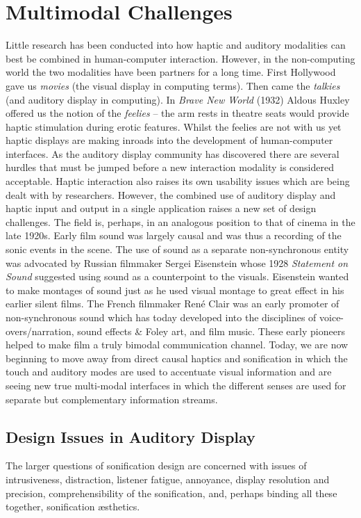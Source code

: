 \documentclass[runningheads]{llncs}
\begin{document}
\section{Multimodal Challenges}
Little research has been conducted into how haptic and auditory modalities can best be combined in human-computer interaction. However, in the non-computing world the two modalities have been partners for a long time. First Hollywood gave us \emph{movies} (the visual display in computing terms). Then came the \emph{talkies} (and auditory display in computing). In  \emph{Brave New World} (1932) Aldous Huxley offered us the notion of the \emph{feelies} -- the arm rests in theatre seats would provide haptic stimulation during erotic features. Whilst the feelies are not with us yet haptic displays are making inroads into the development of human-computer interfaces.  As the auditory display community has discovered there are several hurdles that must be jumped before a new interaction modality is considered acceptable. Haptic interaction also raises its own usability issues which are being dealt with by researchers. However, the combined use of auditory display and haptic input and output in a single application raises a new set of design challenges. The field is, perhaps, in an analogous position to that of cinema in the late 1920s. Early film sound was largely causal  and was thus a recording of the sonic events in the scene. The use of sound as a separate non-synchronous entity was advocated by Russian filmmaker Sergei Eisenstein whose 1928 \textit{Statement on Sound} \cite{Eisenstein:1988} suggested using sound as a counterpoint to the visuals. Eisenstein wanted to make montages of sound just as he used visual montage to great effect in his earlier silent films. The French filmmaker Ren\'{e} Clair was an early promoter of non-synchronous sound which has today developed into the disciplines of voice-overs/narration, sound effects \& Foley art, and film music. These early pioneers helped to make film a truly bimodal communication channel. Today, we are now beginning to move away from direct causal haptics and sonification in which the touch and auditory modes are used to accentuate visual information and are seeing new true multi-modal interfaces in which the different senses are used for separate but complementary information streams.

\subsection{Design Issues in Auditory Display}
The larger questions of sonification design are concerned with issues of intrusiveness, distraction, listener fatigue, annoyance, display resolution and precision, comprehensibility of the sonification, and, perhaps binding all these together, sonification æsthetics.
\end{document}
